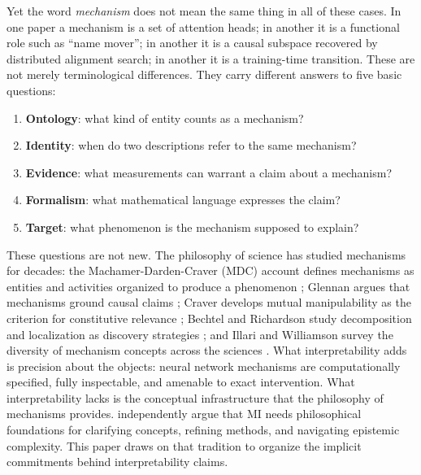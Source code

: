 \documentclass{article}
\begin{document}
Yet the word \emph{mechanism} does not mean the same thing in all of
these cases.  In one paper a mechanism is a set of attention heads;
in another it is a functional role such as ``name mover''; in another
it is a causal subspace recovered by distributed alignment search; in
another it is a training-time transition.  These are not merely
terminological differences.  They carry different answers to five basic
questions:
\begin{enumerate}[leftmargin=*,label=(\arabic*)]
\item \textbf{Ontology}: what kind of entity counts as a mechanism?
\item \textbf{Identity}: when do two descriptions refer to the same mechanism?
\item \textbf{Evidence}: what measurements can warrant a claim about a mechanism?
\item \textbf{Formalism}: what mathematical language expresses the claim?
\item \textbf{Target}: what phenomenon is the mechanism supposed to explain?
\end{enumerate}
These questions are not new.  The philosophy of science has studied
mechanisms for decades: the Machamer-Darden-Craver (MDC) account defines
mechanisms as entities and activities organized to produce a phenomenon
\citep{machamer2000}; Glennan argues that mechanisms ground causal claims
\citep{glennan1996}; Craver develops mutual manipulability as the
criterion for constitutive relevance \citep{craver2007}; Bechtel and
Richardson study decomposition and localization as discovery strategies
\citep{bechtel1993}; and Illari and Williamson survey the diversity of
mechanism concepts across the sciences \citep{illari2012}.  What
interpretability adds is precision about the objects: neural network
mechanisms are computationally specified, fully inspectable, and amenable
to exact intervention.  What interpretability lacks is the conceptual
infrastructure that the philosophy of mechanisms provides.
\citet{williams2025} independently argue that MI needs philosophical
foundations for clarifying concepts, refining methods, and navigating
epistemic complexity.  This paper draws on that tradition to organize
the implicit commitments behind interpretability claims.
\end{document}
